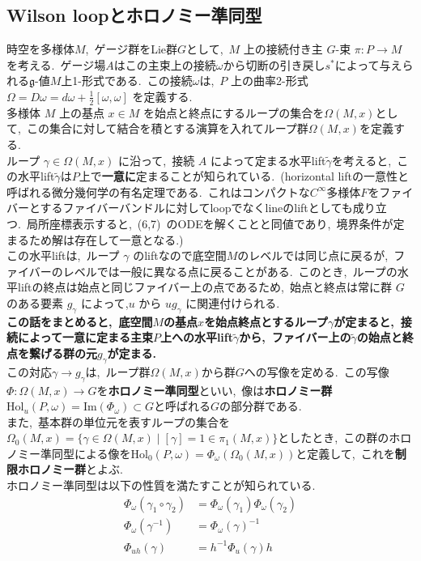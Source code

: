 \documentclass[uplatex,dvipdfmx]{jsarticle}
\begin{document}
\subsection{Wilson loopとホロノミー準同型}
時空を多様体$M$,~ゲージ群をLie群$G$として,~$M$ 上の接続付き主 $G$-束 $\pi: P \to M$ を考える.~ゲージ場$A$はこの主束上の接続$\omega$から切断の引き戻し$s^*$によって与えられる$\mathfrak{g}$-値$M$上1-形式である.~この接続$\omega$は,~$P$ 上の曲率2-形式 $\Omega = D\omega = d\omega + \frac{1}{2}[\omega, \omega]$ を定義する.\\
多様体 $M$ 上の基点 $x \in M$ を始点と終点にするループの集合を$\Omega(M, x)$として,~この集合に対して結合を積とする演算を入れてループ群$\Omega(M, x)$を定義する.~\\
ループ $\gamma \in \Omega(M, x)$ に沿って,~接続 $A$ によって定まる水平lift$\tilde{\gamma}$を考えると,~この水平lift$\tilde{\gamma}$は$P$上で\textbf{一意に}定まることが知られている.~(horizontal liftの一意性と呼ばれる微分幾何学の有名定理である.~これはコンパクトな$C^\infty$多様体$F$をファイバーとするファイバーバンドルに対してloopでなくlineのliftとしても成り立つ.~局所座標表示すると,~(6,7)~のODEを解くことと同値であり,~境界条件が定まるため解は存在して一意となる.)\\
この水平liftは,~ループ $\gamma$ のliftなので底空間$M$のレベルでは同じ点に戻るが,~ファイバーのレベルでは一般に異なる点に戻ることがある.~このとき,~ループの水平liftの終点は始点と同じファイバー上の点であるため,~始点と終点は常に群 $G$ のある要素 $g_\gamma$ によって,$u$ から $u g_\gamma$ に関連付けられる.\\
\textbf{この話をまとめると,~底空間$M$の基点$x$を始点終点とするループ$\gamma$が定まると,~接続によって一意に定まる主束$P$上への水平lift$\tilde{\gamma}$から,~ファイバー上の$\tilde{\gamma}$の始点と終点を繋げる群の元$g_\gamma$が定まる.}\\
この対応$\gamma \to g_\gamma$は,~ループ群$\Omega(M, x)$から群$G$への写像を定める.~この写像$\Phi: \Omega(M, x) \to G$を\textbf{ホロノミー準同型}といい,~像は\textbf{ホロノミー群}$\text{Hol}_u(P,\omega) = \text{Im}(\Phi_\omega)\subset G$と呼ばれる$G$の部分群である.\\
また,~基本群の単位元を表すループの集合を$\Omega_0(M,x)=\{\gamma \in \Omega(M, x) \mid [\gamma]=1 \in \pi_1(M, x) \}$としたとき,~この群のホロノミー準同型による像を$\text{Hol}_0(P, \omega) = \Phi_\omega(\Omega_0(M,x))$と定義して,~これを\textbf{制限ホロノミー群}とよぶ.\\
ホロノミー準同型は以下の性質を満たすことが知られている.
\begin{equation}
    \begin{split}
    \Phi_\omega(\gamma_1 \circ \gamma_2) &= \Phi_\omega(\gamma_1) \Phi_\omega(\gamma_2)\\
    \Phi_\omega(\gamma^{-1}) &= \Phi_\omega(\gamma)^{-1}\\
    \Phi_{uh}(\gamma) &= h^{-1} \Phi_u(\gamma) h
    \end{split}
\end{equation}
\end{document}
